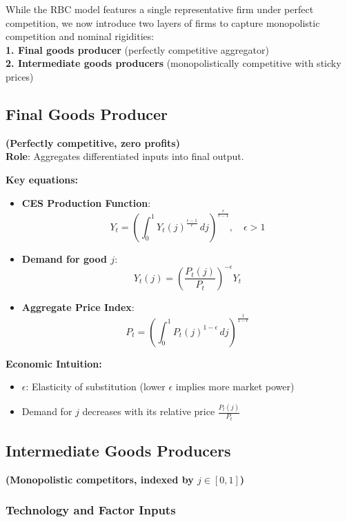 \documentclass[11pt,preprint]{elsarticle}
\numberwithin{equation}{section}
\numberwithin{figure}{section}
\numberwithin{table}{section}
\def\tightlist{} %
\begin{document}
While the RBC model features a single representative firm under perfect
competition, we now introduce two layers of firms to capture
monopolistic competition and nominal rigidities:\\
\textbf{1. Final goods producer} (perfectly competitive aggregator)\\
\textbf{2. Intermediate goods producers} (monopolistically competitive
with sticky prices)

\subsection{Final Goods Producer}\label{final-goods-producer}

\textbf{(Perfectly competitive, zero profits)}\\
\textbf{Role}: Aggregates differentiated inputs into final output.

\textbf{Key equations:}

\begin{itemize}
\item
  \textbf{CES Production Function}: \[
  Y_t = \left( \int_0^1 Y_t(j)^{\frac{\epsilon-1}{\epsilon}} \, dj \right)^{\frac{\epsilon}{\epsilon-1}}, \quad \epsilon > 1
  \]
\item
  \textbf{Demand for good \(j\)}: \[
  Y_t(j) = \left( \frac{P_t(j)}{P_t} \right)^{-\epsilon} Y_t
  \]
\item
  \textbf{Aggregate Price Index}: \[
  P_t = \left( \int_0^1 P_t(j)^{1-\epsilon} \, dj \right)^{\frac{1}{1-\epsilon}}
  \]
\end{itemize}

\textbf{Economic Intuition:}

\begin{itemize}
\tightlist
\item
  \(\epsilon\): Elasticity of substitution (lower \(\epsilon\) implies
  more market power)
\item
  Demand for \(j\) decreases with its relative price
  \(\frac{P_t(j)}{P_t}\)
\end{itemize}

\subsection{Intermediate Goods
Producers}\label{intermediate-goods-producers}

\textbf{(Monopolistic competitors, indexed by \(j \in [0,1]\))}

\subsubsection{Technology and Factor
Inputs}\label{technology-and-factor-inputs}
\end{document}

